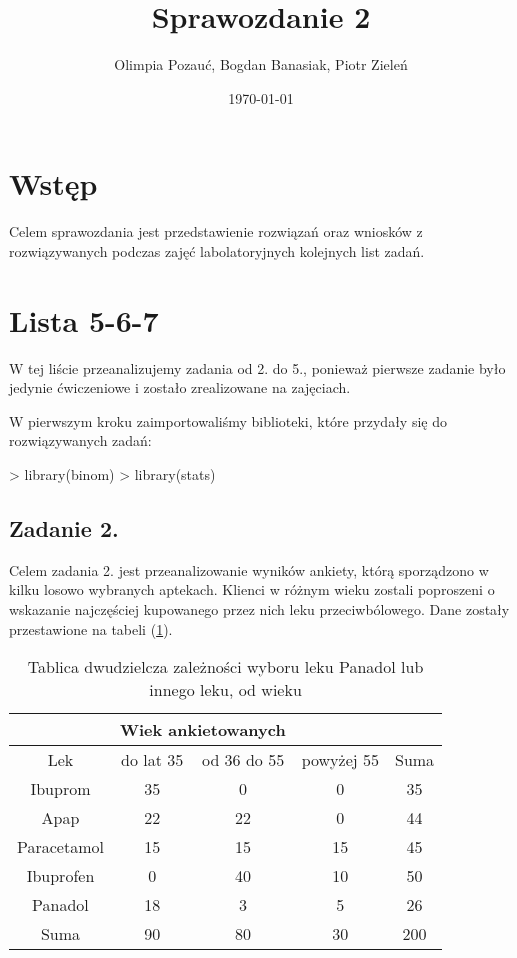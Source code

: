 \documentclass[12pt]{mwart}
\date{\today}
\title{Sprawozdanie 2}
\author{Olimpia Pozauć, Bogdan Banasiak, Piotr Zieleń}
\begin{document}

\maketitle
\tableofcontents
\newpage

\section{Wstęp}

Celem sprawozdania jest przedstawienie rozwiązań oraz wniosków z rozwiązywanych podczas zajęć labolatoryjnych kolejnych list zadań.

\section{Lista 5-6-7}

W tej liście przeanalizujemy zadania od 2. do 5., ponieważ pierwsze zadanie było jedynie ćwiczeniowe i zostało zrealizowane na zajęciach.

W pierwszym kroku zaimportowaliśmy biblioteki, które przydały się do rozwiązywanych zadań:
\begin{Schunk}
\begin{Sinput}
> library(binom)
> library(stats)
\end{Sinput}
\end{Schunk}

\subsection{Zadanie 2.}\label{section:2.1}

Celem zadania 2. jest przeanalizowanie wyników ankiety, którą sporządzono w kilku losowo wybranych aptekach. Klienci w różnym wieku zostali poproszeni o wskazanie najczęściej kupowanego przez nich leku przeciwbólowego. 
Dane zostały przestawione na tabeli (\ref{tab:tabela1}).
\begin{table}[h!]
	\begin{center}
		\begin{tabular}{ccccc}
			\hline
			& \multicolumn{2}{c}{Wiek ankietowanych} & & \\\hline
			Lek & do lat 35 & od 36 do 55 & powyżej 55 & Suma \\\hline
			Ibuprom & 35 & 0 & 0 & 35 \\
			Apap & 22 & 22 & 0 & 44 \\
			Paracetamol & 15 & 15 & 15 & 45 \\
			Ibuprofen & 0 & 40 & 10 & 50 \\
			Panadol & 18 & 3 & 5 & 26 \\\hline
			Suma & 90 & 80 & 30 & 200 \\\hline
		\end{tabular}
	\end{center}
	\caption{Tablica dwudzielcza zależności wyboru leku Panadol lub innego leku, od wieku}
	\label{tab:tabela1}
\end{table}
\end{document}
